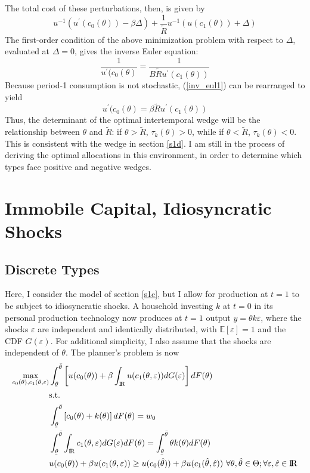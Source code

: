 \documentclass[11pt]{article}
\newcommand{\ubar}[1]{\underaccent{\bar}{#1}}
\newcommand{\p}{\prime}
\newcommand{\ev}{\mathbb{E}}
\newcommand{\inv}[1]{#1^{-1}}
\newcommand{\R}{{\rm I\!R}}
\begin{document}
The total cost of these perturbations, then, is given by 
\[\inv{u}\left( u^\p (c_0(\theta)) - \beta\Delta \right) + \frac{1}{\tilde{R}} \inv{u}\left( u(c_1(\theta)) + \Delta \right)\] 
The first-order condition of the above minimization problem with respect to \( \Delta \), evaluated at \( \Delta = 0 \), gives the inverse Euler equation:
\begin{equation}
    \frac{1}{u^\p (c_0(\theta)} = \frac{1}{B\tilde{R}u^\p(c_1(\theta))} \label{inv_eul1}
\end{equation}
Because period-1 consumption is not stochastic, (\ref{inv_eul1}) can be rearranged to yield 
\[u^\p (c_0(\theta) = \beta\tilde{R}u^\p (c_1(\theta)) \]
Thus, the determinant of the optimal intertemporal wedge will be the relationship between \( \theta \) and \( \tilde{R} \): if \( \theta > \tilde{R} \), \( \tau_k(\theta) > 0 \), while if \( \theta < \tilde{R} \), \( \tau_k(\theta) < 0 \). This is consistent with the wedge in section \ref{s1d}. I am still in the process of deriving the optimal allocations in this environment, in order to determine which types face positive and negative wedges. 

\section{Immobile Capital, Idiosyncratic Shocks} \label{s2}

\subsection{Discrete Types} \label{s2d}

Here, I consider the model of section \ref{s1c}, but I allow for production at \( t = 1 \) to be subject to idiosyncratic shocks. A household investing \( k \) at \( t =0 \) in its personal production technology now produces at \( t = 1 \) output \( y = \theta k \varepsilon \), where the shocks \( \varepsilon \) are independent and identically distributed, with \( \ev[\varepsilon] = 1 \) and the CDF \( G(\varepsilon) \). For additional simplicity, I also assume that the shocks are independent of \( \theta \). The planner's problem is now 
\begin{align}
    \max_{c_0(\theta), c_1(\theta, \varepsilon)} &\int_{\ubar{\theta}}^{\bar{\theta}} \left[ u(c_0(\theta)) + \beta\int_{\R} u(c_1(\theta, \varepsilon))dG(\varepsilon) \right]dF(\theta) \label{obj_stoch} \\
    &\text{s.t.} \notag \\
    &\int_{\ubar{\theta}}^{\bar{\theta}} \left[ c_0(\theta) + k(\theta) \right]dF(\theta) = w_0 \label{rc0_stoch} \\
    &\int_{\ubar{\theta}}^{\bar{\theta}} \int_\R c_1(\theta, \varepsilon)dG(\varepsilon)dF(\theta) = \int_{\ubar{\theta}}^{\bar{\theta}} \theta k(\theta)dF(\theta) \label{rc1_stoch} \\
    &u(c_0(\theta)) + \beta u(c_1(\theta, \varepsilon)) \geq u(c_0(\hat{\theta})) + \beta u(c_1(\hat{\theta}, \hat{\varepsilon}))\text{ }\forall \theta, \hat{\theta}\in\Theta; \forall \varepsilon, \hat{\varepsilon}\in \R \label{icc_stoch}
\end{align}
\end{document}
